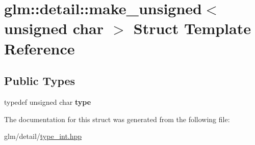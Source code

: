 \hypertarget{structglm_1_1detail_1_1make__unsigned_3_01unsigned_01char_01_4}{\section{glm\-:\-:detail\-:\-:make\-\_\-unsigned$<$ unsigned char $>$ Struct Template Reference}
\label{structglm_1_1detail_1_1make__unsigned_3_01unsigned_01char_01_4}
}
\subsection*{Public Types}
\begin{DoxyCompactItemize}
\item 
\hypertarget{structglm_1_1detail_1_1make__unsigned_3_01unsigned_01char_01_4_a783a55dc0559d4b972a0d85cf08256f2}{typedef unsigned char {\bfseries type}}\label{structglm_1_1detail_1_1make__unsigned_3_01unsigned_01char_01_4_a783a55dc0559d4b972a0d85cf08256f2}

\end{DoxyCompactItemize}


The documentation for this struct was generated from the following file\-:\begin{DoxyCompactItemize}
\item 
glm/detail/\hyperlink{type__int_8hpp}{type\-\_\-int.\-hpp}\end{DoxyCompactItemize}

